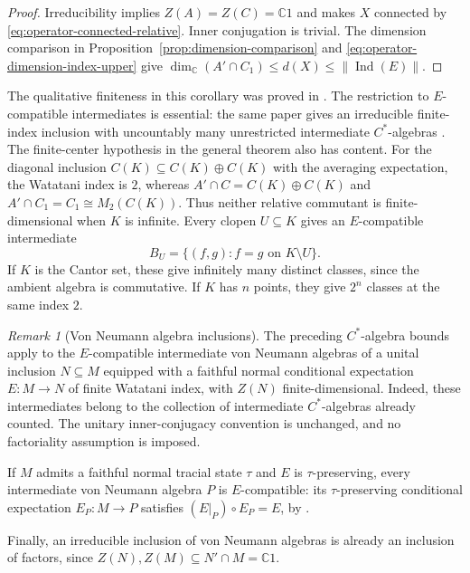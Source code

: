 \documentclass[11pt]{amsart}
\theoremstyle{definition}
\theoremstyle{remark}
\newtheorem{remark}[theorem]{Remark}
\newcommand{\CC}{\mathbb C}
\begin{document}
\begin{proof}
Irreducibility implies $Z(A)=Z(C)=\CC1$ and makes $X$ connected by
\eqref{eq:operator-connected-relative}.  Inner conjugation is trivial.
The dimension comparison in Proposition~\ref{prop:dimension-comparison}
and \eqref{eq:operator-dimension-index-upper} give
$\dim_{\CC}(A'\cap C_1)\leq d(X)\leq\|\operatorname{Ind}(E)\|$.
\end{proof}

The qualitative finiteness in this corollary was proved in
\cite[Corollary~10.6]{GhoshPalcouxLattices}.  The restriction to
$E$-compatible intermediates is essential: the same paper gives an
irreducible finite-index inclusion with uncountably many unrestricted
intermediate $C^*$-algebras \cite[Example~10.7]{GhoshPalcouxLattices}.
The finite-center hypothesis in the general theorem also has content.
For the diagonal inclusion $C(K)\subseteq C(K)\oplus C(K)$ with the
averaging expectation, the Watatani index is $2$, whereas
$A'\cap C=C(K)\oplus C(K)$ and
$A'\cap C_1=C_1\cong M_2(C(K))$.  Thus neither relative commutant
is finite-dimensional when $K$ is infinite.  Every clopen
$U\subseteq K$ gives an $E$-compatible intermediate
\[
 B_U=\{(f,g):f=g\text{ on }K\setminus U\}.
\]
If $K$ is the Cantor set, these give infinitely many distinct classes,
since the ambient algebra is commutative.  If $K$ has $n$ points, they
give $2^n$ classes at the same index $2$.

\begin{remark}[Von Neumann algebra inclusions]
\label{rem:von-neumann-inclusions}
The preceding $C^*$-algebra bounds apply to the $E$-compatible
intermediate von Neumann algebras of a unital inclusion
$N\subseteq M$ equipped with a faithful normal conditional
expectation $E:M\to N$ of finite Watatani index, with $Z(N)$
finite-dimensional.  Indeed, these intermediates belong to the
collection of intermediate $C^*$-algebras already counted.
The unitary inner-conjugacy convention is unchanged, and no
factoriality assumption is imposed.

If $M$ admits a faithful normal tracial state $\tau$ and $E$
is $\tau$-preserving, every intermediate von Neumann algebra
$P$ is $E$-compatible: its $\tau$-preserving conditional
expectation $E_P:M\to P$ satisfies $(E|_P)\circ E_P=E$, by
\cite[Theorem~9.1.2 and Lemma~9.1.4(v)]{AnantharamanPopa}.

Finally, an irreducible inclusion of von Neumann algebras is
already an inclusion of factors, since
$Z(N),Z(M)\subseteq N'\cap M=\CC1$.
\end{remark}
\end{document}
